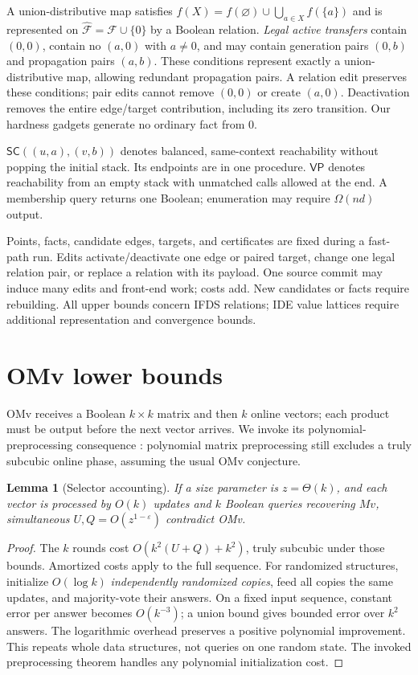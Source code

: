\documentclass[11pt,letterpaper]{article}
\newtheorem{lemma}[theorem]{Lemma}
\theoremstyle{definition}
\newcommand{\SC}{\mathsf{SC}}
\newcommand{\VP}{\mathsf{VP}}
\begin{document}
A union-distributive map satisfies
$f(X)=f(\varnothing)\cup\bigcup_{a\in X}f(\{a\})$ and is represented
on $\widehat{\mathcal F}=\mathcal F\cup\{0\}$ by a Boolean relation.
\emph{Legal active transfers} contain $(0,0)$, contain no $(a,0)$ with
$a\ne0$, and may contain generation pairs $(0,b)$ and propagation
pairs $(a,b)$. These conditions represent exactly a union-distributive
map, allowing redundant propagation pairs. A relation edit preserves these
conditions; pair edits cannot remove $(0,0)$ or create $(a,0)$.
Deactivation removes the entire edge/target contribution, including its
zero transition. Our hardness gadgets generate no ordinary fact from $0$.

$\SC((u,a),(v,b))$ denotes balanced, same-context reachability without
popping the initial stack. Its endpoints are in one procedure.
$\VP$ denotes reachability from an empty stack with unmatched calls
allowed at the end. A membership query returns one Boolean; enumeration
may require $\Omega(nd)$ output.

Points, facts, candidate edges, targets, and certificates are fixed during
a fast-path run. Edits activate/deactivate one edge or paired target,
change one legal relation pair, or replace a relation with its payload.
One source commit may induce many edits and front-end work; costs add.
New candidates or facts require rebuilding. All upper bounds concern IFDS
relations; IDE value lattices require additional representation and
convergence bounds.

\section{OMv lower bounds}\label{sec:lower}
OMv receives a Boolean $k\times k$ matrix and then $k$ online vectors;
each product must be output before the next vector arrives. We invoke
its polynomial-preprocessing consequence \cite[Theorem~2.2]{HKNS15}:
polynomial matrix preprocessing still excludes a truly subcubic online
phase, assuming the usual OMv conjecture.

\begin{lemma}[Selector accounting]\label{lem:selector}
If a size parameter is $z=\Theta(k)$, and each vector is processed by
$O(k)$ updates and $k$ Boolean queries recovering $Mv$, simultaneous
$U,Q=O(z^{1-\varepsilon})$ contradict OMv.
\end{lemma}
\begin{proof}
The $k$ rounds cost $O(k^2(U+Q)+k^2)$, truly subcubic under those bounds.
Amortized costs apply to the full sequence. For randomized structures,
initialize $O(\log k)$ \emph{independently randomized copies}, feed all
copies the same updates, and majority-vote their answers. On a fixed input sequence, constant error
per answer becomes $O(k^{-3})$; a union bound gives bounded error over
$k^2$ answers. The logarithmic overhead preserves a positive polynomial
improvement. This repeats whole data structures, not queries on one
random state. The invoked preprocessing theorem handles any polynomial
initialization cost.
\end{proof}
\end{document}
